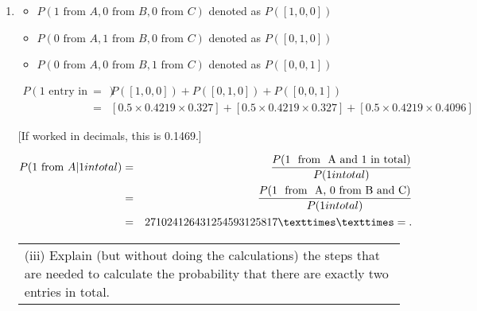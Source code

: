 \documentclass[a4paper,12pt]{article}
\begin{document}
\begin{enumerate}
\begin{table}[ht!]
\begin{tabular}{|p{15cm}|}
\end{tabular}
    
\end{table}


\item 
\begin{framed}
\begin{itemize}
    \item $P(1\mbox{ from }A, 0\mbox{ from }B, 0\mbox{ from }C)$ denoted as  $P([1,0,0])$ 
    \item $P(0\mbox{ from }A, 1\mbox{ from }B, 0\mbox{ from }C)$ denoted as $P([0,1,0])$ 
\item $P(0\mbox{ from }A, 0\mbox{ from }B, 1\mbox{ from }C)$ denoted as $P([0,0,1])$
\end{itemize}
\end{framed}


\begin{eqnarray*}
P(1\mbox{ entry in total}) &=& P([1,0,0]) + P([0,1,0]) + P([0,0,1])\\
&=& \left[ 0.5 \times 0.4219 \times 0.327  \right] + 
\left[ 0.5 \times 0.4219 \times 0.327   \right] + 
\left[ 0.5 \times 0.4219 \times 0.4096   \right] 
\end{eqnarray*}

[If worked in decimals, this is 0.1469.]

\begin{eqnarray*}
P(1 \mbox{ from } A | 1 in total) &=& \frac{P(\mbox{1 \mbox{ from } A and 1 in total})}{ P(1 in total)}\\
&=& \frac{P(\mbox{1 \mbox{ from } A, 0 from B and C}) }{P(1 in total)} \\
&=& 271024126431254593125817××=.\\
\end{eqnarray*}



\begin{table}[ht!]
     
\centering
     
\begin{tabular}{|p{15cm}|}
     
\hline        

\noindent

(iii) Explain (but without doing the calculations) the steps that are needed to calculate the probability that there are exactly two entries in total.


\end{tabular}
\end{table}
\end{enumerate}
\end{document}
